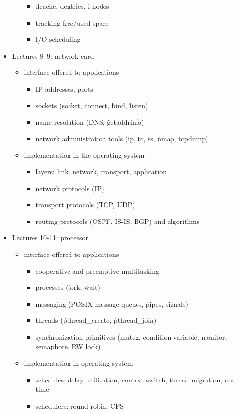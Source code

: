 \begin{itemize}
\begin{itemize}
\begin{itemize}
    \item dcache, dentries, i-nodes
    \item tracking free/used space
    \item I/O scheduling
    \end{itemize}
  \end{itemize}
\item Lectures 8--9: network card
  \begin{itemize}
  \item interface offered to applications
    \begin{itemize}
    \item IP addresses, ports
    \item sockets (\.{socket}, \.{connect}, \.{bind}, \.{listen})
    \item name resolution (DNS, \.{getaddrinfo})
    \item network administration tools
      (\.{ip}, \.{tc}, \.{ss}, \.{nmap}, \.{tcpdump})
    \end{itemize}
  \item implementation in the operating system
    \begin{itemize}
    \item layers: link, network, transport, application
    \item network protocols (IP)
    \item transport protocols (TCP, UDP)
    \item routing protocols (OSPF, IS-IS, BGP) and algorithms
    \end{itemize}
  \end{itemize}
\item Lectures 10-11: processor
  \begin{itemize}
  \item interface offered to applications
    \begin{itemize}
    \item cooperative and preemptive multitasking
    \item processes (\.{fork}, \.{wait})
    \item messaging (POSIX message queues, pipes, signals)
    \item threads (\.{pthread\_create}, \.{pthread\_join})
    \item synchronization primitives
      (mutex, condition variable, monitor, semaphore, RW lock)
    \end{itemize}
  \item implementation in operating system
    \begin{itemize}
    \item schedules: delay, utilisation, context switch, thread migration, real time
    \item schedulers: round robin, CFS
    \end{itemize}
  \end{itemize}
\end{itemize}

